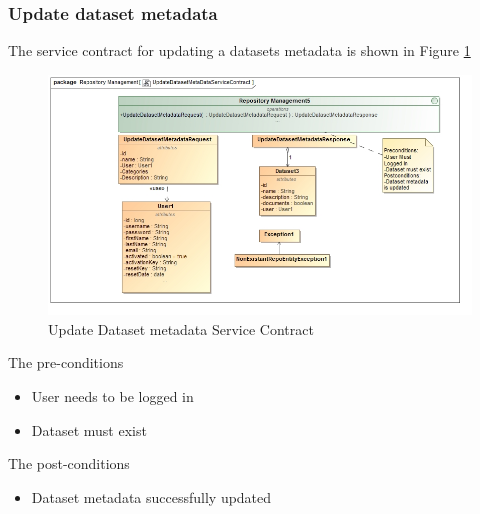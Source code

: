 \subsubsection {Update dataset metadata}
The service contract for updating a datasets metadata is shown in Figure \ref{fig:updateDatasetMetadataServiceContract}
\begin{figure}[H]
	\begin{center}
		\includegraphics[scale=0.6]{../Diagrams and Charts/Test Data/UpdateDatasetMetaDataServiceContract.jpg}
		\caption{Update Dataset metadata Service Contract}
		\label{fig:updateDatasetMetadataServiceContract}
	\end{center}
	
\end{figure}

The pre-conditions
\begin{itemize}
	\item User needs to be logged in
	\item Dataset must exist
\end{itemize}

The post-conditions
\begin{itemize}
	\item Dataset metadata successfully updated
\end{itemize}
